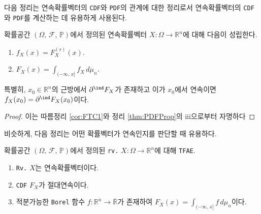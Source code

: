 다음 정리는 연속확률벡터의 \texttt{CDF}와 \texttt{PDF}의 관계에 대한 정리로서 연속확률벡터의 \texttt{CDF}와 \texttt{PDF}를 계산하는 데 유용하게 사용된다.

\begin{theorem}\label{thm:CDFPDFRel}
    확률공간 $(\Omega,\,\mathcal{F},\,\mathbb{P})$에서 정의된 연속확률벡터 $X:\Omega\to\mathbb{R}^n$에 대해 다음이 성립한다.
    \begin{enumerate}
        \item $f_X(x)=F_X^{(s)}(x)$.\footnotemark
        \item $F_X(x)=\int_{(-\infty,\,x]}f_X\,d\mu_n$.
    \end{enumerate}
    특별히, $x_0\in\mathbb{R}^n$의 근방에서 $\partial^\ind F_X$가 존재하고 이가 $x_0$에서 연속이면 $f_X(x_0)=\partial^\ind F_X(x_0)$이다.
\end{theorem}

\begin{proof}
    이는 따름정리 \ref{cor:FTC1}와 정리 \ref{thm:PDFProp}의 iii으로부터 자명하다
\end{proof}

비슷하게, 다음 정리는 어떤 확률벡터가 연속인지를 판단할 때 유용하다.

\begin{theorem}\label{thm:rvContinuous}
    확률공간 $(\Omega,\,\mathcal{F},\,\mathbb{P})$에서 정의된 \texttt{rv.} $X:\Omega\to\mathbb{R}^n$에 대해 \texttt{TFAE}.
    \begin{enumerate}
        \item \texttt{Rv.} $X$는 연속확률벡터이다.
        \item \texttt{CDF} $F_X$가 절대연속이다.
        \item 적분가능한 \texttt{Borel} 함수 $f:\mathbb{R}^n\to\overline{\mathbb{R}}$가 존재하여 $F_X(x)=\int_{(-\infty,\,x]}f\,d\mu_n$이다.
    \end{enumerate}
\end{theorem}


